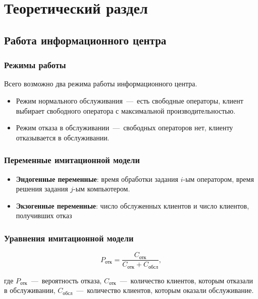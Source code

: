 \chapter{Теоретический раздел}

\section{Работа информационного центра}

\subsection*{Режимы работы}

Всего возможно два режима работы информационного центра. 

\begin{itemize}
	\item Режим нормального обслуживания~---~есть свободные операторы, клиент выбирает свободного оператора с максимальной производительностью.
	\item Режим отказа в обслуживании~---~свободных операторов нет, клиенту отказывается в обслуживании.
\end{itemize}

\subsection*{Переменные имитационной модели}

\begin{itemize}
	\item \textbf{Эндогенные переменные}: время обработки задания $i$-ым оператором, время решения задания $j$-ым компьютером.
	\item \textbf{Экзогенные переменные}: число обслуженных клиентов и число клиентов, получивших отказ
\end{itemize}

\subsection*{Уравнения имитационной модели}

\begin{equation}
	P_{\text{отк}} = \frac{C_{\text{отк}}}{C_{\text{отк}} + C_{\text{обсл}}},
\end{equation}

\noindent где $P_{\text{отк}}$~---~вероятность отказа, $C_{\text{отк}}$~---~количество клиентов, которым отказали в обслуживании, $C_{\text{обсл}}$~---~количество клиентов, которым оказали обслуживание.

